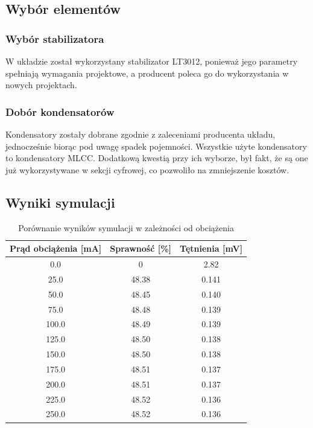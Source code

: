 \documentclass{article}
\begin{document}
\subsection{Wybór elementów}
\subsubsection{Wybór stabilizatora}
W układzie został wykorzystany stabilizator LT3012, ponieważ jego parametry spełniają wymagania projektowe, a producent poleca go do wykorzystania w nowych projektach.

\subsubsection{Dobór kondensatorów}
Kondensatory zostały dobrane zgodnie z zaleceniami producenta układu, jednocześnie biorąc pod uwagę spadek pojemności. Wszystkie użyte kondensatory to kondensatory MLCC. Dodatkową kwestią przy ich wyborze, był fakt, że są one już wykorzystywane w sekcji cyfrowej, co pozwoliło na zmniejszenie kosztów.
\subsection{Wyniki symulacji}
\begin{table}[H]
    \centering
    \caption{Porównanie wyników symulacji w zależności od obciążenia}
    \label{tab:efficiency_ripple}
    \begin{tabular}{ccc}
        \toprule
        \textbf{Prąd obciążenia [mA]} & \textbf{Sprawność [\%]} & \textbf{Tętnienia [mV]} \\
        \midrule
        0.0                           & 0                       & 2.82                    \\
        25.0                          & 48.38                   & 0.141                   \\
        50.0                          & 48.45                   & 0.140                   \\
        75.0                          & 48.48                   & 0.139                   \\
        100.0                         & 48.49                   & 0.139                   \\
        125.0                         & 48.50                   & 0.138                   \\
        150.0                         & 48.50                   & 0.138                   \\
        175.0                         & 48.51                   & 0.137                   \\
        200.0                         & 48.51                   & 0.137                   \\
        225.0                         & 48.52                   & 0.136                   \\
        250.0                         & 48.52                   & 0.136                   \\
        \bottomrule
    \end{tabular}
\end{table}
\end{document}
